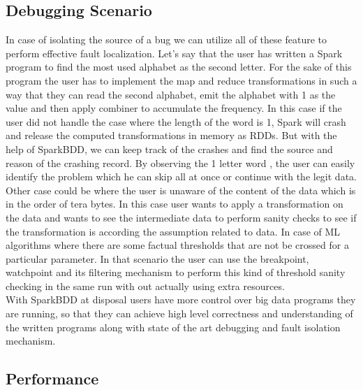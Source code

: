 \documentclass{acm_proc_article-sp}
\begin{document}
\subsection{Debugging Scenario}
In case of isolating the source of a bug we can utilize all of these feature to perform effective fault localization. Let's say that the user has written a Spark program to find the most used alphabet as the second letter. For the sake of this program the user has to implement the map and reduce transformations in such a way that they can read the second alphabet, emit the alphabet with 1 as the value and then apply combiner to accumulate the frequency. In this case if the user did not handle the case where the length of the word is 1, Spark will crash and release the computed transformations in memory as RDDs. But with the help of SparkBDD, we can keep track of the crashes and find the source and reason of the crashing record. By observing the 1 letter word , the user can easily identify the problem which he can skip all at once or continue with the legit data.\\
Other case could be where the user is unaware of the content of the data which is in the order of tera bytes. In this case user wants to apply a transformation on the data and wants to see the intermediate data to perform sanity checks to see if the transformation is according the assumption related to data. In case of ML algorithms where there are some factual thresholds that are not be crossed for a particular parameter. In that scenario the user can use the breakpoint, watchpoint and its filtering mechanism to perform this kind of threshold sanity checking in the same run with out actually using extra resources. \\
With SparkBDD at disposal users have more control over big data programs they are running, so that they can achieve high level correctness and understanding of the written programs along with state of the art debugging and fault isolation mechanism. \\

\subsection{Performance}
\end{document}
